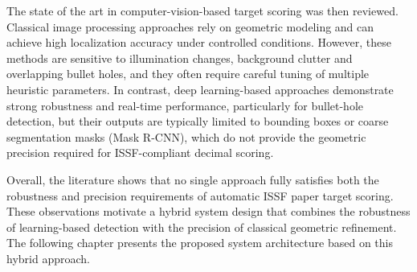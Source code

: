 The state of the art in computer-vision-based target scoring was then reviewed. Classical image
processing approaches rely on geometric modeling and can achieve high localization
accuracy under controlled conditions. However, these methods are sensitive to illumination
changes, background clutter and overlapping bullet holes, and they often require
careful tuning of multiple heuristic parameters. In contrast, deep learning-based approaches
demonstrate strong robustness and real-time performance, particularly for bullet-hole detection,
but their outputs are typically limited to bounding boxes or coarse segmentation masks (Mask R-CNN), which do
not provide the geometric precision required for ISSF-compliant decimal scoring.

Overall, the literature shows that no single approach fully satisfies both the robustness and
precision requirements of automatic ISSF paper target scoring. These observations motivate a
hybrid system design that combines the robustness of learning-based detection with the precision
of classical geometric refinement. The following chapter presents the proposed system architecture
based on this hybrid approach.
